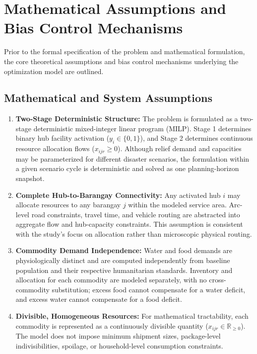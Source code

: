 \section{Mathematical Assumptions and Bias Control Mechanisms}
\label{sec:assumptions}

Prior to the formal specification of the problem and mathematical formulation, the core theoretical assumptions and bias control mechanisms underlying the optimization model are outlined.

\subsection{Mathematical and System Assumptions}
\begin{enumerate}
    \item \textbf{Two-Stage Deterministic Structure:} The problem is formulated as a two-stage deterministic mixed-integer linear program (MILP). Stage 1 determines binary hub facility activation ($y_i \in \{0,1\}$), and Stage 2 determines continuous resource allocation flows ($x_{ijr} \ge 0$). Although relief demand and capacities may be parameterized for different disaster scenarios, the formulation within a given scenario cycle is deterministic and solved as one planning-horizon snapshot.

    \item \textbf{Complete Hub-to-Barangay Connectivity:} Any activated hub $i$ may allocate resources to any barangay $j$ within the modeled service area. Arc-level road constraints, travel time, and vehicle routing are abstracted into aggregate flow and hub-capacity constraints. This assumption is consistent with the study's focus on allocation rather than microscopic physical routing.

    \item \textbf{Commodity Demand Independence:} Water and food demands are physiologically distinct and are computed independently from baseline population and their respective humanitarian standards. Inventory and allocation for each commodity are modeled separately, with no cross-commodity substitution; excess food cannot compensate for a water deficit, and excess water cannot compensate for a food deficit.

    \item \textbf{Divisible, Homogeneous Resources:} For mathematical tractability, each commodity is represented as a continuously divisible quantity ($x_{ijr} \in \mathbb{R}_{\ge 0}$). The model does not impose minimum shipment sizes, package-level indivisibilities, spoilage, or household-level consumption constraints.


\end{enumerate}
